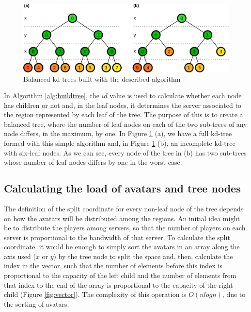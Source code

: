 \documentclass[acmjacm]{acmtrans2m}
\begin{document}
\begin{figure}[!t]
	\centering
	\includegraphics[width=\linewidth]{images/kdtree}
	\caption{Balanced kd-trees built with the described algorithm}
	\label{fig:kdtree}
\end{figure}

In Algorithm \ref{alg:buildtree}, the $id$ value is used to calculate whether each node has children or not and, in the leaf nodes, it determines the server associated to the region represented by each leaf of the tree. The purpose of this is to create a balanced tree, where the number of leaf nodes on each of the two sub-trees of any node differs, in the maximum, by one. In Figure \ref{fig:kdtree} (a), we have a full kd-tree formed with this simple algorithm and, in Figure \ref{fig:kdtree} (b), an incomplete kd-tree with six-leaf nodes. As we can see, every node of the tree in (b) has two sub-trees whose number of leaf nodes differs by one in the worst case.

\subsection{Calculating the load of avatars and tree nodes}

The definition of the split coordinate for every non-leaf node of the tree depends on how the avatars will be distributed among the regions. An initial idea might be to distribute the players among servers, so that the number of players on each server is proportional to the bandwidth of that server. To calculate the split coordinate, it would be enough to simply sort the avatars in an array along the axis used ($x$ or $y$) by the tree node to split the space and, then, calculate the index in the vector, such that the number of elements before this index is proportional to the capacity of the left child and the number of elements from that index to the end of the array is proportional to the capacity of the right child (Figure \ref{fig:vector}). The complexity of this operation is $O(nlogn)$, due to the sorting of avatars.
\end{document}
